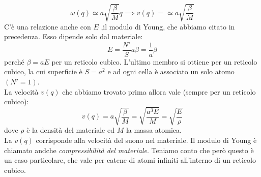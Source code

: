 \documentclass{book}
\begin{document}
        $$\omega(q) \simeq a \sqrt{\frac{\beta}{M}} q \implies v(q) = \simeq a \sqrt{\frac{\beta}{M}}$$
        C'è una relazione anche con $E$ ,il modulo di Young, che abbiamo citato in precedenza. Esso dipende solo dal materiale:
        $$E = \frac{N'}{S}a\beta = \frac{1}{a}\beta$$
        perché $\beta = aE$ per un reticolo cubico.
        L'ultimo membro si ottiene per un reticolo cubico, la cui superficie è $S=a^{2}$ e ad ogni cella è associato un solo atomo $(N'=1)$. \\
        La velocità $v(q)$ che abbiamo trovato prima allora vale (sempre per un reticolo cubico):
        $$v(q) = a \sqrt{\frac{\beta}{M}} = \sqrt{\frac{a^{3}E}{M}} = \sqrt{\frac{E}{\rho}}$$
        dove $\rho$ è la densità del materiale ed $M$ la massa atomica.\\
        La $v(q)$ corrisponde alla velocità del suono nel materiale. Il modulo di Young è chiamato andche \textit{compressibilità del materiale}. Teniamo conto che però questo è un caso particolare, che vale per catene di atomi infiniti all'interno di un reticolo cubico.
\end{document}
